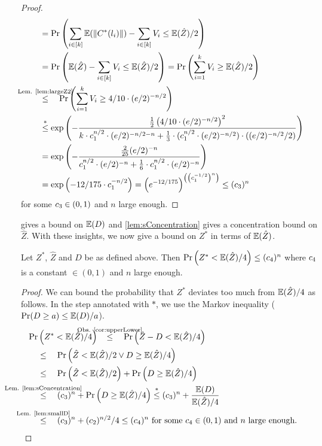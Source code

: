 \documentclass[a4paper,USenglish,cleveref]{lipics-v2021}
\def\refRelObs#1#2{\stackrel{\mathclap{\text{Obs. \ref{#1}}}}{#2}\quad}
\def\refRelLem#1#2{\stackrel{\mathclap{\text{Lem. \ref{#1}}}}{#2}\quad}
\begin{document}
\begin{proof}
\begin{align*}
      &=\Pr\left(\sum_{i \in [k]} \expect(\|C^*(l_i)\|) - \sum_{i \in [k]} V_i \leq \expect(\hat Z)/2\right)\\
      &=\Pr\left(\expect(\hat Z) - \sum_{i \in [k]} V_i \leq \expect(\hat Z)/2\right)
      =\Pr\left(\sum_{i=1}^k V_i \geq \expect(\hat Z)/2\right)\\
      &\refRelLem{lem:largeZ2}{\leq} \Pr\left(\sum_{i=1}^k V_i \geq 4/10 \cdot (e/2)^{-n/2} \right)\\
      &\overset{*}{\leq} \exp \left( -\frac{\tfrac{1}{2} \left(4/10 \cdot (e/2)^{-n/2}\right)^2}{k\cdot\constantMaxC^{n/2} \cdot (e/2)^{-n/2-n} + \tfrac{1}{3} \cdot (\constantMaxC^{n/2} \cdot (e/2)^{-n/2}) \cdot ((e/2)^{-n/2}/2)} \right)\\
      &= \exp \left(-\frac{\tfrac{2}{25} (e/2)^{-n}}{\constantMaxC^{n/2} \cdot (e/2)^{-n} + \tfrac{1}{6} \cdot \constantMaxC^{n/2} \cdot (e/2)^{-n}} \right)\\
      &= \exp \left(-12/175 \cdot \constantMaxC^{-n/2}\right)
      =\left(e^{-12/175}\right)^{\left(\left(\constantMaxC^{-1/2}\right)^n\right)}
      \leq (\constantZHat)^n
  \end{align*}
  for some $c_3 \in (0, 1)$ and $n$ large enough.
\end{proof}

 gives a bound on $\mathbb{E}(D)$ and \cref{lem:sConcentration} gives a concentration bound on $\hat Z$.
With these insights, we now give a bound on $Z^*$ in terms of $\mathbb{E}(\hat Z)$.

\begin{lemma}
  Let $Z^*$, $\hat Z$ and $D$ be as defined above.
  Then $\Pr\left(Z^* < \mathbb{E}(\hat Z)/4\right) \leq (c_4)^n$  where $c_4$ is a constant $\in (0, 1)$ and $n$ large enough.
  \label{lem:largeZ}
\end{lemma}
\begin{proof}
  We can bound the probability that $Z^*$ deviates too much from $\mathbb{E}(\hat Z)/4$ as follows.
  In the step annotated with $*$, we use the Markov inequality ($\Pr(D \geq a)\leq \mathbb{E}(D)/a$).
  \begin{align*}
    \Pr&\left(Z^* < \expect(\hat Z)/4\right)
      \hspace{3mm}\refRelObs{cor:upperLower}{\leq} \Pr\left(\hat Z - D < \expect(\hat Z)/4\right)\\
      &\leq \quad \Pr\left(\hat Z < \expect(\hat Z)/2 \vee D \geq \expect(\hat Z)/4\right)\\
      &\leq \quad \Pr\left(\hat Z < \expect(\hat Z)/2\right) + \Pr\left(D \geq \expect(\hat Z)/4\right)\\
      &\refRelLem{lem:sConcentration}{\leq} (\constantZHat)^n +\Pr\left(D \geq \expect(\hat Z)/4\right)
      \overset{*}{\leq} (\constantZHat)^n + \frac{\expect(D)}{\expect(\hat Z)/4}\\
      &\refRelLem{lem:smallD}{\leq} (\constantZHat)^n + (\constantD)^{n/2}/4
      \leq (\constantZ)^n \textrm{ for some $\constantZ \in (0, 1)$ and $n$ large enough.}
    \tag*{\qedhere}
  \end{align*}
\end{proof}
\end{document}
